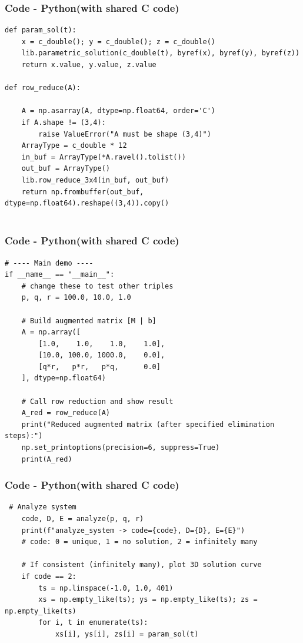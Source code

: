 \documentclass{beamer}
\theoremstyle{remark}
\numberwithin{equation}{section}
\begin{document}
\begin{frame}[fragile]
\frametitle{Code - Python(with shared C code)}
\begin{lstlisting}
def param_sol(t):
    x = c_double(); y = c_double(); z = c_double()
    lib.parametric_solution(c_double(t), byref(x), byref(y), byref(z))
    return x.value, y.value, z.value

def row_reduce(A):
    
    A = np.asarray(A, dtype=np.float64, order='C')
    if A.shape != (3,4):
        raise ValueError("A must be shape (3,4)")
    ArrayType = c_double * 12
    in_buf = ArrayType(*A.ravel().tolist())
    out_buf = ArrayType()
    lib.row_reduce_3x4(in_buf, out_buf)
    return np.frombuffer(out_buf, dtype=np.float64).reshape((3,4)).copy()


\end{lstlisting}
\end{frame}

\begin{frame}[fragile]
\frametitle{Code - Python(with shared C code)}
\begin{lstlisting}
# ---- Main demo ----
if __name__ == "__main__":
    # change these to test other triples
    p, q, r = 100.0, 10.0, 1.0

    # Build augmented matrix [M | b]
    A = np.array([
        [1.0,    1.0,    1.0,    1.0],
        [10.0, 100.0, 1000.0,    0.0],
        [q*r,   p*r,   p*q,      0.0]
    ], dtype=np.float64)

    # Call row reduction and show result
    A_red = row_reduce(A)
    print("Reduced augmented matrix (after specified elimination steps):")
    np.set_printoptions(precision=6, suppress=True)
    print(A_red)

\end{lstlisting}
\end{frame}

\begin{frame}[fragile]
\frametitle{Code - Python(with shared C code)}
\begin{lstlisting}
 # Analyze system
    code, D, E = analyze(p, q, r)
    print(f"analyze_system -> code={code}, D={D}, E={E}")
    # code: 0 = unique, 1 = no solution, 2 = infinitely many

    # If consistent (infinitely many), plot 3D solution curve
    if code == 2:
        ts = np.linspace(-1.0, 1.0, 401)
        xs = np.empty_like(ts); ys = np.empty_like(ts); zs = np.empty_like(ts)
        for i, t in enumerate(ts):
            xs[i], ys[i], zs[i] = param_sol(t)


\end{lstlisting}
\end{frame}
\end{document}
